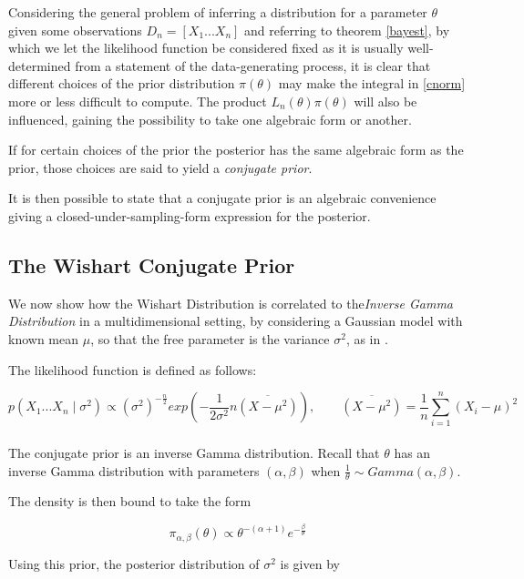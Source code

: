 \documentclass[12pt,openright,twoside,a4paper]{book}
\begin{document}
Considering the general problem of inferring a distribution for a parameter $\theta$ given some observations $D_n=[X_1...X_n]$ and referring to theorem \ref{bayest}, by which we let the likelihood function be considered fixed as it is usually well-determined from a statement of the data-generating process,  it is clear that different choices of the prior distribution $\pi(\theta)$ may make the integral in \ref{cnorm} more or less difficult to compute.
The product $L_n(\theta)\pi(\theta)$ will also be influenced, gaining the possibility to take one algebraic form or another.

If for certain choices of the prior the posterior has the same algebraic form as the prior, those choices are said to yield a \textit{conjugate prior}.

It is then possible to state that a conjugate prior is an algebraic convenience giving a closed-under-sampling-form expression for the posterior.

\subsection{The Wishart Conjugate Prior}

We now show how the Wishart Distribution is correlated to the\textit{Inverse Gamma Distribution} in a multidimensional setting, by  considering a Gaussian model with known mean $\mu$, so that the free parameter is the variance  $\sigma^2$, as in \cite{SML}.

The likelihood function is defined as follows:

\begin{equation}
p(X_1...X_n\mid \sigma^2)\propto (\sigma^2)^{-\frac{n}{2}}exp(-\frac{1}{2\sigma^2}n \overline{(X-\mu^2)}) , \qquad \overline{(X-\mu^2)}=\frac{1}{n}\sum_{i=1}^n(X_i-\mu)^2
\label{gausslike}
\end{equation}
\\[12pt]

The conjugate prior is an inverse Gamma distribution. Recall that $\theta$ has an inverse Gamma distribution with parameters $(\alpha,\beta)$   when $\frac{1}{\theta}\sim Gamma(\alpha,\beta)$.

The density is then bound to take the form 

\begin{equation}
\pi_{\alpha,\beta}(\theta)\propto \theta^{-(\alpha+1)}e^{-\frac{\beta}{\theta}}
\end{equation}

Using this prior, the posterior distribution of $\sigma^2$ is given by
\end{document}
